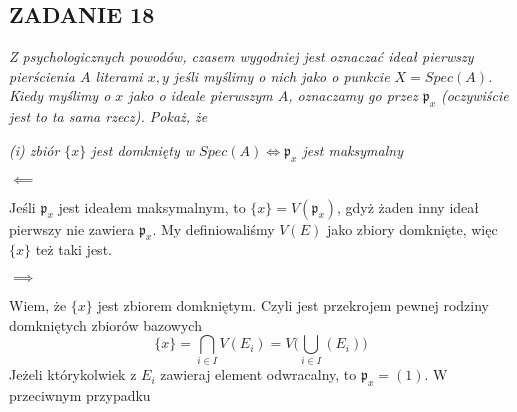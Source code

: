 \documentclass{article}
\begin{document}
\subsection*{ZADANIE 18}
\emph{Z psychologicznych powodów, czasem wygodniej jest oznaczać ideał pierwszy pierścienia $A$ literami $x,y$ jeśli myślimy o nich jako o punkcie $X=Spec(A)$. Kiedy myślimy o $x$ jako o ideale pierwszym $A$, oznaczamy go przez $\mathfrak{p}_x$ (oczywiście jest to ta sama rzecz). Pokaż, że}

\emph{(i) zbiór $\{x\}$ jest domknięty w $Spec(A)\iff\mathfrak{p}_x$ jest maksymalny}
\medskip

$\impliedby$

Jeśli $\mathfrak{p}_x$ jest ideałem maksymalnym, to $\{x\}=V(\mathfrak{p}_x)$, gdyż żaden inny ideał pierwszy nie zawiera $\mathfrak{p}_x$. My definiowaliśmy $V(E)$ jako zbiory domknięte, więc $\{x\}$ też taki jest.

$\implies$

Wiem, że $\{x\}$ jest zbiorem domkniętym. Czyli jest przekrojem pewnej rodziny domkniętych zbiorów bazowych
$$\{x\}=\bigcap\limits_{i\in I}V(E_i)=V\Big(\bigcup\limits_{i\in I}(E_i)\Big)$$
Jeżeli którykolwiek z $E_i$ zawieraj element odwracalny, to $\mathfrak{p}_x=(1)$. W przeciwnym przypadku
\end{document}
